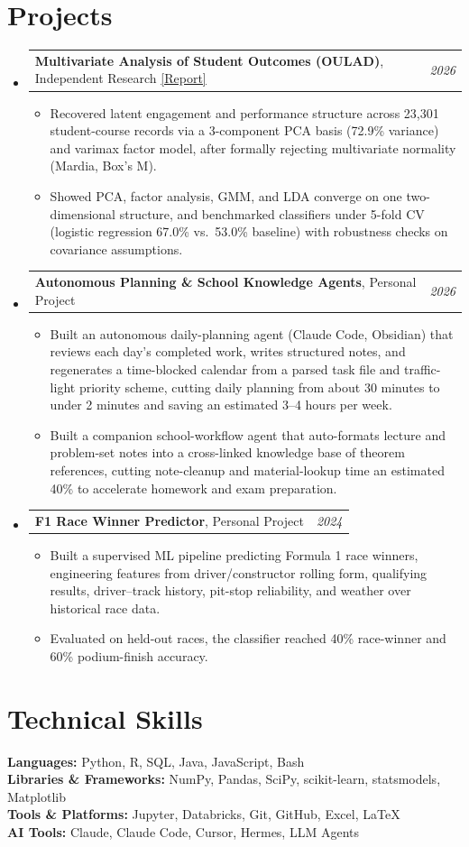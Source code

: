 \documentclass[letterpaper,11pt]{article}
\makeatletter
\newcommand{\resumeItem}[1]{
  \item\small{
    {#1 \vspace{-3pt}}
  }
}
\newcommand{\resumeProjectHeading}[2]{
    \item
    \begin{tabular*}{0.97\textwidth}{l@{\extracolsep{\fill}}r}
      \small#1 & #2 \\
    \end{tabular*}\vspace{-5pt}
}
\newcommand{\resumeSubHeadingListStart}{\begin{itemize}[leftmargin=0.15in, label={}]}
\newcommand{\resumeSubHeadingListEnd}{\end{itemize}}
\newcommand{\resumeItemListStart}{\begin{itemize}}
\newcommand{\resumeItemListEnd}{\end{itemize}\vspace{-7pt}}
\makeatother
\begin{document}
\section{Projects}
  \resumeSubHeadingListStart
    \resumeProjectHeading
      {{\bf Multivariate Analysis of Student Outcomes (OULAD)}, Independent Research \href{https://avi-gobrin.github.io/personal-site/assets/oulad-sta437.pdf}{\color{blue}[Report]}}{{\em 2026}}
      \resumeItemListStart
        \resumeItem{Recovered latent engagement and performance structure across 23,301 student-course records via a 3-component PCA basis (72.9\% variance) and varimax factor model, after formally rejecting multivariate normality (Mardia, Box's M).}
        \resumeItem{Showed PCA, factor analysis, GMM, and LDA converge on one two-dimensional structure, and benchmarked classifiers under 5-fold CV (logistic regression 67.0\% vs.\ 53.0\% baseline) with robustness checks on covariance assumptions.}
      \resumeItemListEnd
    \resumeProjectHeading
      {{\bf Autonomous Planning \& School Knowledge Agents}, Personal Project}{{\em 2026}}
      \resumeItemListStart
        \resumeItem{Built an autonomous daily-planning agent (Claude Code, Obsidian) that reviews each day's completed work, writes structured notes, and regenerates a time-blocked calendar from a parsed task file and traffic-light priority scheme, cutting daily planning from about 30 minutes to under 2 minutes and saving an estimated 3--4 hours per week.}
        \resumeItem{Built a companion school-workflow agent that auto-formats lecture and problem-set notes into a cross-linked knowledge base of theorem references, cutting note-cleanup and material-lookup time an estimated 40\% to accelerate homework and exam preparation.}
      \resumeItemListEnd
    \resumeProjectHeading
      {{\bf F1 Race Winner Predictor}, Personal Project}{{\em 2024}}
      \resumeItemListStart
        \resumeItem{Built a supervised ML pipeline predicting Formula 1 race winners, engineering features from driver/constructor rolling form, qualifying results, driver--track history, pit-stop reliability, and weather over historical race data.}
        \resumeItem{Evaluated on held-out races, the classifier reached 40\% race-winner and 60\% podium-finish accuracy.}
      \resumeItemListEnd
  \resumeSubHeadingListEnd
\section{Technical Skills}
 \begin{itemize}[leftmargin=0.15in, label={}]
    \small{\item{
     \textbf{Languages:} Python, R, SQL, Java, JavaScript, Bash \\
     \textbf{Libraries \& Frameworks:} NumPy, Pandas, SciPy, scikit-learn, statsmodels, Matplotlib \\
     \textbf{Tools \& Platforms:} Jupyter, Databricks, Git, GitHub, Excel, \LaTeX \\
     \textbf{AI Tools:} Claude, Claude Code, Cursor, Hermes, LLM Agents
    }}
 \end{itemize}
\end{document}
